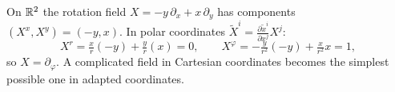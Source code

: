 \begin{example}
On $\mathbb{R}^2$ the rotation field $X=-y\,\partial_x+x\,\partial_y$ has components $(X^x,X^y)=(-y,x)$. In polar coordinates $\tilde X^i=\frac{\partial\tilde x^i}{\partial x^j}X^j$:
\[
X^r=\tfrac{x}{r}(-y)+\tfrac{y}{r}(x)=0,\qquad X^\varphi=-\tfrac{y}{r^2}(-y)+\tfrac{x}{r^2}x=1,
\]
so $X=\partial_\varphi$. A complicated field in Cartesian coordinates becomes the simplest possible one in adapted coordinates.
\end{example}

